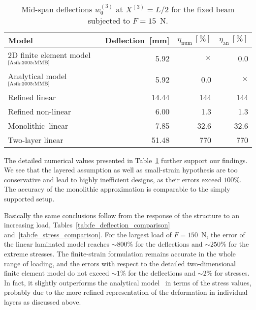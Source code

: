 \documentclass[11pt]{article}
\newcommand{\rev}[1]{#1}
\newcommand{\lay}[1]{^{(#1)}}
\newcommand{\X}[1]{X\lay{#1}}
\newcommand{\wc}[1]{w_0\lay{#1}}
\newcommand{\etanum}{\eta_\mathrm{num}}
\newcommand{\etaan}{\eta_\mathrm{an}}
\newcommand{\Tref}[1]{Table~\ref{#1}}
\begin{document}
\begin{table}[ht]
\centering
\caption{Mid-span deflections $\wc{3}$ at $\X{3} = L/2$ for the fixed beam
subjected to $F = 15$~N.}
\label{tab:fe_mid_span_deflection}
\begin{tabular}{lrrr}
\hline
Model	& Deflection~[mm]	& $\etanum~[\%]$ & $\etaan~[\%]$ \\
\hline
2D finite element model$^\text{\cite{Asik:2005:MMB}}$ &
5.92 & $\times$ & 0.0 \\
Analytical model$^\text{\cite{Asik:2005:MMB}}$ & 
5.92 & 0.0 & $\times$ \\
\rev{Refined} linear & 
14.44 & 144 & 144 \\
\rev{Refined} non-linear & 
6.00 & 1.3 & 1.3 \\
Monolithic~\rev{linear} & 
7.85 & 32.6 & 32.6 \\
\rev{Two-layer linear} &
51.48 & 770 & 770 \\
\hline
\end{tabular}
\end{table}

The detailed numerical values presented in \Tref{tab:fe_mid_span_deflection}
further support our findings. We see that the layered assumption as well as
small-strain hypothesis are too conservative and lead to 
highly inefficient designs, as their errors exceed $100\%$. The accuracy of the
monolithic approximation is comparable to the simply supported setup.

Basically the same conclusions follow from the response of the structure to an
increasing load, Tables~\ref{tab:fe_deflection_comparison}
and~\ref{tab:fe_stress_comparison}. For the largest load of $F = 150$~N, the
error of the linear laminated model reaches $\sim 800\%$ for the deflections and
$\sim 250\%$ for the extreme stresses. The finite-strain formulation remains
accurate in the whole range of loading, and the errors with respect to the
detailed two-dimensional finite element model do not exceed $\sim 1\%$ for the
deflections and $\sim 2\%$ for stresses. In fact, it slightly outperforms the
analytical model~\cite{Asik:2005:MMB} in terms of the stress values, probably
due to the more refined representation of the deformation in individual layers
as discussed above.
\end{document}
